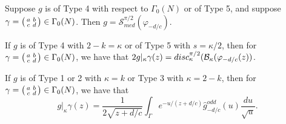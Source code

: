 \documentclass[10pt,a4paper]{amsart}
\begin{document}
\begin{prop}\label{prop: med resum} Suppose $g$ is of Type 4 with respect to $\Gamma_0(N)$ or of Type 5, and suppose $\gamma = \begin{psmallmatrix} a & b \\ c & d\end{psmallmatrix} \in \Gamma_0(N)$. Then $g= \mathcal{S}_{med}^{\pi/2}(\varphi_{-d/c})$.	
\end{prop}

\begin{prop}\label{prop: eichler discont}
	If $g$ is of Type 4 with $2-k= \kappa$ or of Type 5 with $s = \kappa/2$, then  for $\gamma = \begin{psmallmatrix} a & b \\ c & d \end{psmallmatrix} \in \Gamma_0(N)$, we have that 
 $2g|_{\kappa}\gamma(z) = \emph{disc}_\kappa^{\pi/2}(\mathcal{B}_\kappa(\varphi_{-d/c}(z))$.
\end{prop}

\begin{prop} \label{prop: modular slash}
If $g$ is of Type 1 or 2 with $\kappa = k$ or Type 3 with $\kappa = 2-k$, then for $\gamma = \begin{psmallmatrix} a & b \\ c & d \end{psmallmatrix} \in \Gamma_0(N)$, we have that 
\[g|_{\kappa}\gamma(z) = \frac{1}{2\sqrt{z+d/c}} \int_{\Gamma}e^{-u/(z+d/c)}\hat{g}_{-d/c}^{odd}(u)\frac{du}{\sqrt{u}}.\]
\end{prop}
\end{document}
